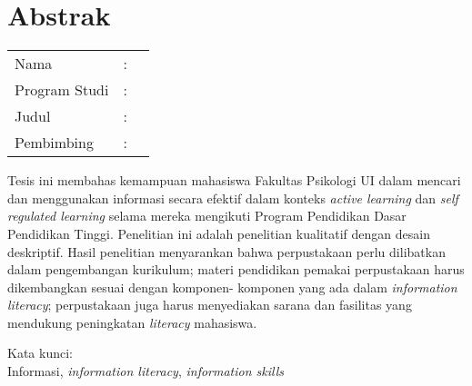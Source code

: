 %
%
%

\chapter*{Abstrak}

\vspace*{0.2cm}
{
	\setlength{\parindent}{0pt}
	
	\begin{tabular}{@{}l l p{10cm}}
		Nama&: & \penulis \\
		Program Studi&: & \program \\
		Judul&: & \judul \\
		Pembimbing&: & \pembimbing \\
	\end{tabular}

	\bigskip
	\bigskip

	Tesis ini membahas kemampuan mahasiswa Fakultas Psikologi UI dalam mencari dan
	menggunakan informasi secara efektif dalam konteks \textit{active learning} dan \textit{self regulated
	learning} selama mereka mengikuti Program Pendidikan Dasar Pendidikan Tinggi.
	Penelitian ini adalah penelitian kualitatif dengan desain deskriptif. Hasil penelitian
	menyarankan bahwa perpustakaan perlu dilibatkan dalam pengembangan kurikulum;
	materi pendidikan pemakai perpustakaan harus dikembangkan sesuai dengan komponen-
	komponen yang ada dalam \textit{information literacy}; perpustakaan juga harus menyediakan
	sarana dan fasilitas yang mendukung peningkatan \textit{literacy} mahasiswa.

	\bigskip

	Kata kunci:\\
	Informasi, \textit{information literacy}, \textit{information skills}
}

\newpage